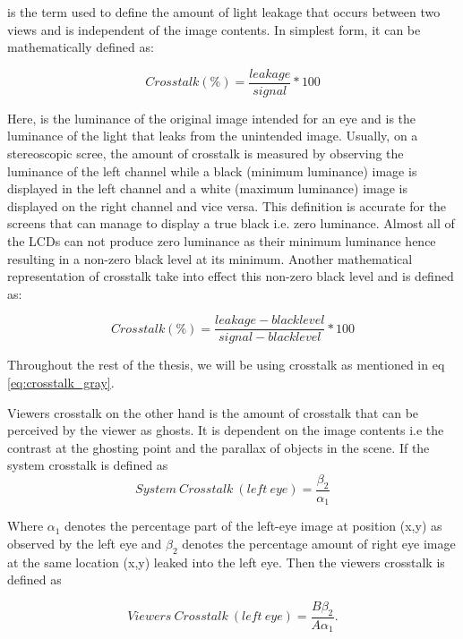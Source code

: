  is the term used to define the amount of light leakage that occurs between two views and is independent of the image contents. In simplest form, it can be mathematically defined as:

\begin{equation}
Crosstalk(\%) = \frac{leakage}{signal} *100
\label{eq:simple_crosstalk}
\end{equation}

Here,  is the luminance of the original image intended for an eye and  is the luminance of the light that leaks from the unintended image. Usually, on a stereoscopic scree, the amount of crosstalk is measured by observing the luminance of the left channel while a black (minimum luminance) image is displayed in the left channel and a white (maximum luminance) image is displayed on the right channel and vice versa. This definition is accurate for the screens that can manage to display a true black i.e. zero luminance. Almost all of the LCDs can not produce zero luminance as their minimum luminance hence resulting in a non-zero black level at its minimum. Another mathematical representation of crosstalk take into effect this non-zero black level and is defined as:

\begin{equation}
Crosstalk(\%) = \frac{leakage - black level}{signal - black level} *100
\label{eq:crosstalk_gray}
\end{equation}

Throughout the rest of the thesis, we will be using crosstalk as mentioned in eq \ref{eq:crosstalk_gray}.

Viewers crosstalk on the other hand is the amount of crosstalk that can be perceived by the viewer as ghosts. It is dependent on the image contents i.e the contrast at the ghosting point and the parallax of objects in the scene. If the system crosstalk is defined as
\begin{equation}
System\ Crosstalk\ (left\ eye) = \frac{\beta_2}{\alpha_1}
\label{eq:system_ct}
\end{equation}

Where \(\alpha_1\) denotes the percentage part of the left-eye image at position (x,y) as observed by the left eye and \(\beta_2\) denotes the percentage amount of right eye image at the same location (x,y) leaked into the left eye. Then the viewers crosstalk is defined as

\begin{equation}
Viewers\ Crosstalk\ (left\ eye) = \frac{B\beta_2}{A\alpha_1}.
\end{equation}

